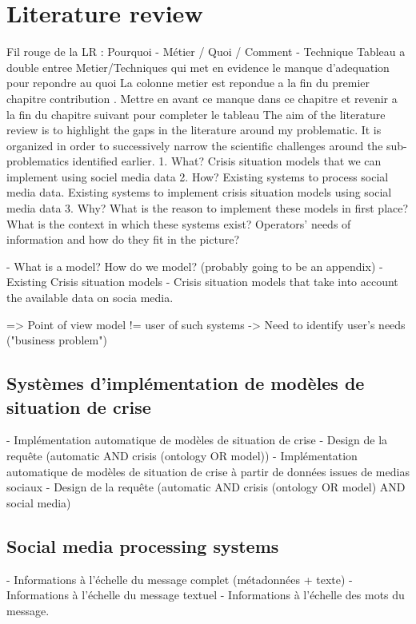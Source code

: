 \chapter{Literature review}

Fil rouge de la LR : Pourquoi - Métier / Quoi / Comment - Technique
Tableau a double entree Metier/Techniques qui met en evidence le manque d'adequation pour repondre au quoi
La colonne metier est repondue a la fin du premier chapitre contribution . Mettre en avant ce manque dans ce chapitre et revenir a la fin du chapitre suivant pour completer le tableau
The aim of the literature review is to highlight the gaps in the literature around my problematic.
It is organized in order to successively narrow the scientific challenges around the sub-problematics identified earlier.
1. What? Crisis situation models that we can implement using sociel media data
2. How? Existing systems to process social media data. Existing systems to implement crisis situation models using social media data
3. Why? What is the reason to implement these models in first place? What is the context in which these systems exist? Operators' needs of information and how do they fit in the picture?

- What is a model? How do we model? (probably going to be an appendix)
- Existing Crisis situation models
- Crisis situation models that take into account the available data on socia media.

=> Point of view model != user of such systems
-> Need to identify user's needs ("business problem")

\section{Systèmes d'implémentation de modèles de situation de crise}
- Implémentation automatique de modèles de situation de crise
- Design de la requête (automatic AND crisis (ontology OR model))
- Implémentation automatique de modèles de situation de crise à partir de données issues de medias sociaux
- Design de la requête (automatic AND crisis (ontology OR model) AND social media)

\section{Social media processing systems}
- Informations à l'échelle du message complet (métadonnées + texte)
- Informations à l'échelle du message textuel
- Informations à l'échelle des mots du message.

